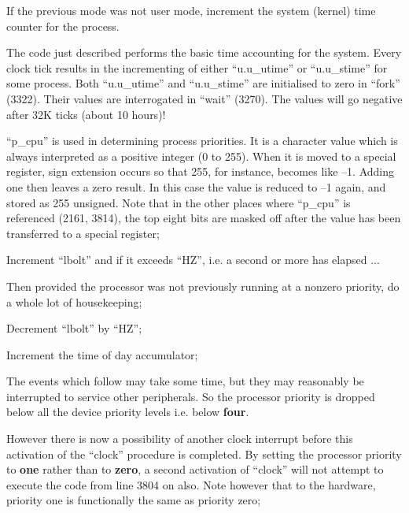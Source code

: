 \item[3792:] If the previous mode was not user
mode, increment the system (kernel) time counter for the process.
\ed

The code just described performs the
basic time accounting for the system.
Every clock tick results in the incrementing of either ``u.u\_utime'' or
``u.u\_stime'' for some process. Both
``u.u\_utime'' and ``u.u\_stime'' are
initialised to zero in ``fork'' (3322). Their
values are interrogated in ``wait''
(3270). The values will go negative
after 32K ticks (about 10 hours)!

\bd
\item[3795:] ``p\_cpu'' is used in determining
 process priorities. It is a character value which is always
 interpreted as a positive integer
 (0 to 255). When it is moved to a
 special register, sign extension
 occurs so that 255, for instance,
 becomes like --1. Adding one then
 leaves a zero result. In this
 case the value is reduced to --1
 again, and stored as 255
 unsigned. Note that in the other
 places where ``p\_cpu'' is referenced (2161, 3814), the top eight
 bits are masked off after the
 value has been transferred to a
 special register;

\item[3797:] Increment ``lbolt'' and if it
exceeds ``HZ'', i.e. a second or
more has elapsed ...

\item[3798:] Then provided the processor was
 not previously running at a nonzero priority, do a whole lot of
 housekeeping;

\item[3800:] Decrement ``lbolt'' by ``HZ'';

\item[3801:] Increment the time of day accumulator;

\item[3803:] The events which follow may take
 some time, but they may reasonably be interrupted to service
 other peripherals. So the processor priority is dropped below all
 the device priority levels i.e.
 below {\bf four}.

However there is now a possibility of another clock interrupt
before this activation of the
``clock'' procedure is completed.
By setting the processor priority
to {\bf one} rather than to {\bf zero}, a
second activation of ``clock'' will
not attempt to execute the code
from line 3804 on also. Note however that
to the hardware, priority one is functionally the same
as priority zero;

